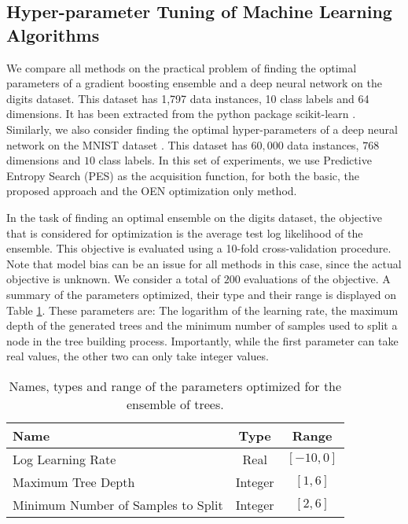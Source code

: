 \subsection{Hyper-parameter Tuning of Machine Learning Algorithms}

We compare all methods on the practical problem of finding the optimal 
parameters of a gradient boosting ensemble \citep{friedman2001greedy} and a deep neural network on the digits dataset.
This dataset has 1,797 data instances, 10 class labels and 64 dimensions. It has been
extracted from the python package scikit-learn \citep{scikit-learn}.
Similarly, we also consider finding the optimal hyper-parameters of a deep neural network on 
the MNIST dataset \citep{lecun1998mnist}. This dataset has $60,000$ data instances, $768$ dimensions
and $10$ class labels. In this set of experiments, we use Predictive Entropy Search (PES) as 
the acquisition function, for both the basic, the proposed approach and the OEN optimization only method.

In the task of finding an optimal ensemble on the digits dataset, the objective that is considered for 
optimization is the average test log likelihood of the ensemble. This objective is evaluated using a 10-fold 
cross-validation procedure. Note that model bias can be an issue for all methods in this case, since the actual 
objective is unknown.  We consider a total of $200$ evaluations of the objective. A summary of the parameters optimized, 
their type and their range is displayed on Table \ref{table:6}. These parameters are: The logarithm of the learning rate, 
the maximum depth of the generated trees and the minimum number of samples used to split a node in the 
tree building process. Importantly, while the first parameter can take real values, the other two can only take integer values.

\begin{table}[htb]
\centering
\caption{Names, types and range of the parameters optimized for the ensemble of trees.}
\begin{tabular}{ l | c | c }
 \hline
 {\bf Name} & {\bf Type} & {\bf Range} \\
 \hline
 Log Learning Rate & Real & $[-10,0]$ \\
 Maximum Tree Depth & Integer & $[1,6]$ \\
 Minimum Number of Samples to Split & Integer & $[2,6]$ \\
 \hline
\end{tabular}
\label{table:6}
\end{table}


